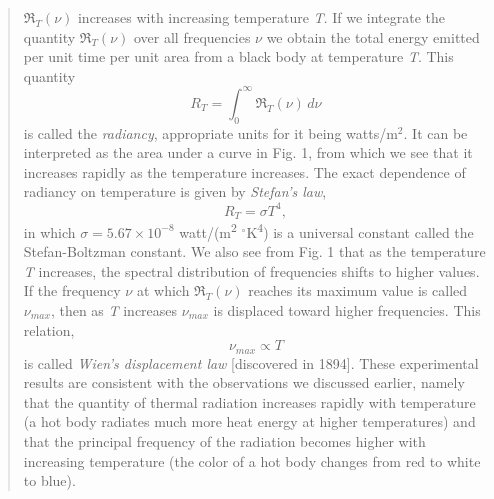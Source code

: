 \begin{quotation}
$\Re_T(\nu)$ increases with increasing temperature
\emph{T}. If we integrate the quantity $\Re_T(\nu)$ over
all frequencies $\nu$ we obtain the total energy emitted per unit
time per unit area from a black body at temperature \emph{T}. This
quantity
%
\begin{equation}
R_T = \int_{0}^{\infty}\! \Re_T(\nu)\, d\nu
\end{equation}
%
is called the \emph{radiancy}, appropriate units for it being
watts/m$^2$. It can be interpreted as the area under a
curve in Fig. 1, from which we see that it increases rapidly as the
temperature increases. The exact dependence of radiancy on temperature
is given by \emph{Stefan's law},
%
\begin{equation}
R_T = \sigma T^{4},
\end{equation}
%
in which $\sigma = 5.67 \times 10^{-8}$ watt/(m\textsuperscript{2} $^\circ$K\textsuperscript{4}) is a universal
constant called the Stefan-Boltzman constant. We also see from Fig. 1
that as the temperature \emph{T} increases, the spectral distribution of
frequencies shifts to higher values. If the frequency $\nu$ at which
$\Re_T(\nu)$ reaches its maximum value is called
$\nu_{max}$, then as \emph{T} increases
$\nu_{max}$ is displaced toward higher frequencies. This
relation,
%
\begin{equation}\tag{3a}
\nu_{max} \propto T
\end{equation}
%
is called \emph{Wien's displacement law} {[}discovered in 1894{]}. These
experimental results are consistent with the observations we discussed
earlier, namely that the quantity of thermal radiation increases rapidly
with temperature (a hot body radiates much more heat energy at higher
temperatures) and that the principal frequency of the radiation becomes
higher with increasing temperature (the color of a hot body changes from
red to white to blue).


\end{quotation}

